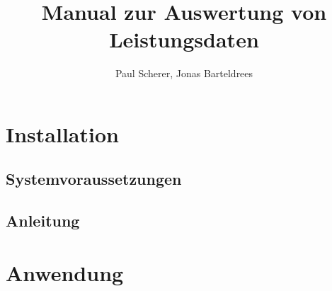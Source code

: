 \documentclass[a4 paper, 12 pt]{paper}
\title{Manual zur Auswertung von Leistungsdaten}
\author{Paul Scherer, Jonas Barteldrees}
\begin{document}
\maketitle
\tableofcontents
\thispagestyle{empty}
\newpage
\setcounter{page}{1}
\section{Installation}
	\subsection{Systemvoraussetzungen}
	\subsection{Anleitung}
\section{Anwendung}
\end{document}
